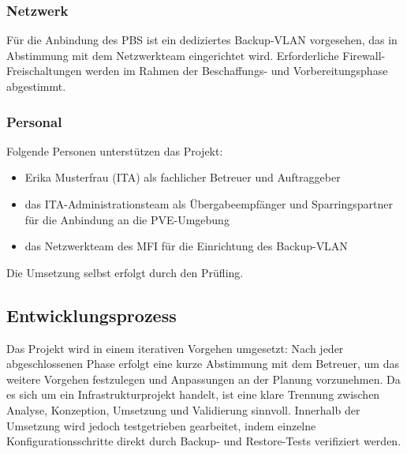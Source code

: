 \subsubsection{Netzwerk}
Für die Anbindung des \ac{PBS} ist ein dediziertes Backup-\ac{VLAN}
vorgesehen, das in Abstimmung mit dem Netzwerkteam eingerichtet wird.
Erforderliche Firewall-Freischaltungen werden im Rahmen der
Beschaffungs- und Vorbereitungsphase abgestimmt.

\subsubsection{Personal}
Folgende Personen unterstützen das Projekt:
\begin{itemize}
    \item Erika Musterfrau (\ac{ITA}) als fachlicher Betreuer und Auftraggeber
    \item das \ac{ITA}-Administrationsteam als Übergabeempfänger und Sparringspartner für die Anbindung an die \ac{PVE}-Umgebung
    \item das Netzwerkteam des \ac{MFI} für die Einrichtung des Backup-\ac{VLAN}
\end{itemize}
Die Umsetzung selbst erfolgt durch den Prüfling.

\subsection{Entwicklungsprozess}
\label{sec:Entwicklungsprozess}

Das Projekt wird in einem iterativen Vorgehen umgesetzt: Nach jeder
abgeschlossenen Phase erfolgt eine kurze Abstimmung mit dem Betreuer,
um das weitere Vorgehen festzulegen und Anpassungen an der Planung
vorzunehmen.
Da es sich um ein Infrastrukturprojekt handelt, ist eine klare
Trennung zwischen Analyse, Konzeption, Umsetzung und Validierung
sinnvoll. Innerhalb der Umsetzung wird jedoch testgetrieben
gearbeitet, indem einzelne Konfigurationsschritte direkt durch
Backup- und Restore-Tests verifiziert werden.

